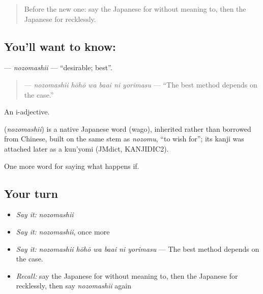 \label{lesson:JA-C531-nozomashii}



\begin{quote}
Before the new one: say the Japanese for without meaning to, then the Japanese for recklessly.
\end{quote}

\subsection*{You'll want to know: }
\textbf{} — \emph{nozomashii} — \textquotedblleft{}desirable; best\textquotedblright{}.

\begin{quote}
\textbf{   } — \emph{nozomashii hōhō wa baai ni yorimasu} — \textquotedblleft{}The best method depends on the case.\textquotedblright{}
\end{quote}

An i-adjective.

\begin{cousinweb}
\textbf{} (\emph{nozomashii}) is a native Japanese word (wago), inherited rather than borrowed from Chinese, built on the same stem as \emph{nozomu}, \textquotedblleft{}to wish for\textquotedblright{}; its kanji was attached later as a kun'yomi (JMdict, KANJIDIC2).
\end{cousinweb}

\begin{grammarlens}[title={What you've built}]
One more word for saying what happens if.
\end{grammarlens}

\subsection*{Your turn}
\begin{itemize}
\raggedright
  \item \emph{Say it:} \emph{nozomashii}
  \item \emph{Say it:} \emph{nozomashii}, once more
  \item \emph{Say it:} \emph{nozomashii hōhō wa baai ni yorimasu} — The best method depends on the case.
  \item \emph{Recall:} say the Japanese for without meaning to, then the Japanese for recklessly, then say \emph{nozomashii} again
\end{itemize}

